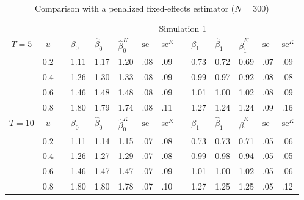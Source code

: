 \documentclass[12pt]{article}
\begin{document}


\begin{table}
\footnotesize
\renewcommand\thetable{C1b}
\caption{Comparison with a penalized fixed-effects estimator ($N = 300$)}
\label{C1b}
\centering
\begin{tabular}{cc
m{0.01cm}m{0.5cm}m{0.5cm}m{0.5cm}m{0.3cm}m{0.3cm}
m{0.01cm}m{0.5cm}m{0.5cm}m{0.5cm}m{0.3cm}m{0.3cm}
}
\noalign{\vspace{0.2cm}}
\hline
\hline
\noalign{\vspace{0.2cm}}
 &&& \multicolumn{11}{c}{Simulation 1}\\
\noalign{\vspace{0.1cm}}
\hline
\noalign{\vspace{0.2cm}}
$T = 5$ & $u$ && 
	$\beta_0$ & $\hat\beta_0$ & $\hat\beta_0^K$ & $\text{se}$ & $\text{se}^K$ &&
	$\beta_1$ & $\hat\beta_1$ & $\hat\beta_1^K$ & $\text{se}$ & $\text{se}^K$\\
\cline{4-8}\cline{10-14}
\noalign{\vspace{0.1cm}}
& $0.2$ && 1.11 & 1.17 & 1.20 & .08 & .09 && 0.73 & 0.72 & 0.69 & .07 & .09 \\
& $0.4$ && 1.26 & 1.30 & 1.33 & .08 & .09 && 0.99 & 0.97 & 0.92 & .08 & .08 \\
& $0.6$ && 1.46 & 1.48 & 1.48 & .08 & .09 && 1.01 & 1.00 & 1.02 & .08 & .09 \\
& $0.8$ && 1.80 & 1.79 & 1.74 & .08 & .11 && 1.27 & 1.24 & 1.24 & .09 & .16 \\
\noalign{\vspace{0.2cm}}
$T = 10$ & $u$ && 
	$\beta_0$ & $\hat\beta_0$ & $\hat\beta_0^K$ & $\text{se}$ & $\text{se}^K$ &&
	$\beta_1$ & $\hat\beta_1$ & $\hat\beta_1^K$ & $\text{se}$ & $\text{se}^K$\\
\cline{4-8}\cline{10-14}
\noalign{\vspace{0.1cm}}
& $0.2$ && 1.11 & 1.14 & 1.15 & .07 & .08 && 0.73 & 0.73 & 0.71 & .05 & .06 \\
& $0.4$ && 1.26 & 1.27 & 1.29 & .07 & .08 && 0.99 & 0.98 & 0.94 & .05 & .05 \\
& $0.6$ && 1.46 & 1.47 & 1.47 & .07 & .09 && 1.01 & 1.00 & 1.02 & .05 & .06 \\
& $0.8$ && 1.80 & 1.80 & 1.78 & .07 & .10 && 1.27 & 1.25 & 1.25 & .05 & .12 \\

\end{tabular}
\end{table}
\end{document}
